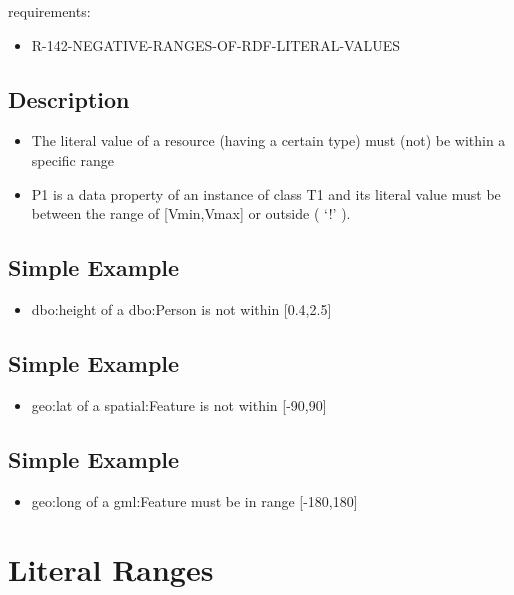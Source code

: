 \documentclass{llncs}
\begin{document}
requirements:

\begin{itemize}
	\item R-142-NEGATIVE-RANGES-OF-RDF-LITERAL-VALUES
\end{itemize}

\subsection{Description}

\begin{itemize}
	\item The literal value of a resource (having a certain type) must (not) be within a specific range
  \item P1 is a data property of an instance of class T1 and its literal value must be between the range of [Vmin,Vmax] or outside ( ‘!' ).
\end{itemize}

\subsection{Simple Example}

\begin{itemize}
	\item dbo:height of a dbo:Person is not within [0.4,2.5]
\end{itemize}

\subsection{Simple Example}

\begin{itemize}
	\item geo:lat of a spatial:Feature is not within [-90,90]
\end{itemize}

\subsection{Simple Example}

\begin{itemize}
	\item geo:long of a gml:Feature must be in range [-180,180]
\end{itemize}



\section{Literal Ranges}
\end{document}

